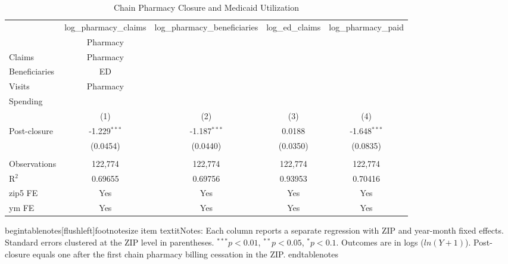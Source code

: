 \begin{table}[htbp]
   \caption{\label{tab:main} Chain Pharmacy Closure and Medicaid Utilization}
   \bigskip
   \centering
   \begin{adjustbox}{max width=\textwidth}
\begin{tabular}{lcccc}
      \toprule
                   & log\_pharmacy\_claims   & log\_pharmacy\_beneficiaries   & log\_ed\_claims   & log\_pharmacy\_paid\\    
                   & Pharmacy\\Claims        & Pharmacy\\Beneficiaries        & ED\\Visits        & Pharmacy\\Spending \\     
                   & (1)                     & (2)                            & (3)               & (4)\\  
      \midrule 
      Post-closure & -1.229$^{***}$          & -1.187$^{***}$                 & 0.0188            & -1.648$^{***}$\\   
                   & (0.0454)                & (0.0440)                       & (0.0350)          & (0.0835)\\   
       \\
      Observations & 122,774                 & 122,774                        & 122,774           & 122,774\\  
      R$^2$        & 0.69655                 & 0.69756                        & 0.93953           & 0.70416\\  
      \midrule 
      zip5 FE      & Yes                     & Yes                            & Yes               & Yes\\  
      ym FE        & Yes                     & Yes                            & Yes               & Yes\\  
      \bottomrule
   \end{tabular}
\end{adjustbox}
begin{tablenotes}[flushleft]footnotesize
item textit{Notes:} Each column reports a separate regression with ZIP and year-month fixed effects. Standard errors clustered at the ZIP level in parentheses. $^{***}p<0.01$, $^{**}p<0.05$, $^{*}p<0.1$. Outcomes are in logs ($ln(Y+1)$). Post-closure equals one after the first chain pharmacy billing cessation in the ZIP.
end{tablenotes}
\end{table}
